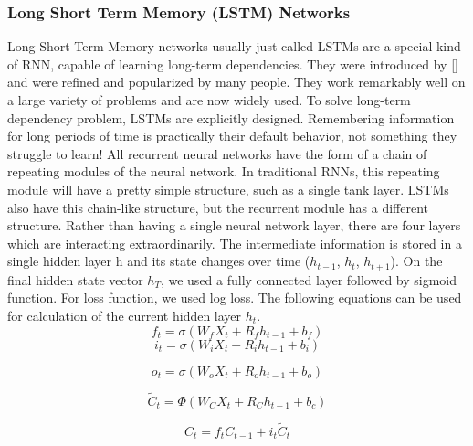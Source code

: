 \documentclass[12pt,a4paper]{article}
\begin{document}
\subsubsection{Long Short Term Memory (LSTM) Networks}
Long Short Term Memory networks usually just called LSTMs are a special kind of RNN,
capable of learning long-term dependencies. They were introduced by [] and were refined and
popularized by many people. They work remarkably well on a large variety of problems and are
now widely used. To solve long-term dependency problem, LSTMs are explicitly designed. Remembering information for long periods of time is practically their default behavior, not something
they struggle to learn! All recurrent neural networks have the form of a chain of repeating modules
of the neural network. In traditional RNNs, this repeating module will have a pretty simple structure, such
as a single tank layer. LSTMs also have this chain-like structure, but the recurrent module has a
different structure. Rather than having a single neural network layer, there are four layers which are interacting extraordinarily.   The intermediate information is stored in a single hidden layer h and its state
changes over time ($h_{t-1}$, $h_{t}$, $h_{t+1}$). On the final hidden state vector $h_{T}$, we used a fully connected
layer followed by sigmoid function. For loss function, we used log loss. The following equations can be used for calculation of the current hidden layer $h_{t}$.
\begin{equation}
    f_t = \sigma(W_fX_t + R_fh_{t-1} + b_f )
\end{equation}
\begin{equation}
    i_t = \sigma(W_iX_t + R_ih_{t-1} + b_i)
\end{equation}

\begin{equation}
    o_t = \sigma(W_o X_t + R_oh_{t-1} + b_o)
\end{equation}
    
\begin{equation}
    \tilde{C}_t = \Phi(W_C X_t + R_C h_{t-1} + b_c) 
\end{equation}

\begin{equation}
    C_t = f_t C_{t-1} + i_t \tilde{C}_t 
\end{equation}
\end{document}
